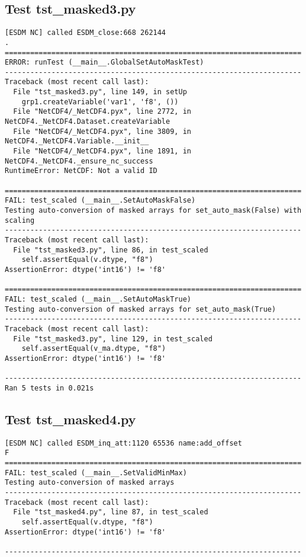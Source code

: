 \subsection{Test tst\_masked3.py}

\begin{verbatim}
[ESDM NC] called ESDM_close:668 262144
.
======================================================================
ERROR: runTest (__main__.GlobalSetAutoMaskTest)
----------------------------------------------------------------------
Traceback (most recent call last):
  File "tst_masked3.py", line 149, in setUp
    grp1.createVariable('var1', 'f8', ())
  File "NetCDF4/_NetCDF4.pyx", line 2772, in NetCDF4._NetCDF4.Dataset.createVariable
  File "NetCDF4/_NetCDF4.pyx", line 3809, in NetCDF4._NetCDF4.Variable.__init__
  File "NetCDF4/_NetCDF4.pyx", line 1891, in NetCDF4._NetCDF4._ensure_nc_success
RuntimeError: NetCDF: Not a valid ID

======================================================================
FAIL: test_scaled (__main__.SetAutoMaskFalse)
Testing auto-conversion of masked arrays for set_auto_mask(False) with scaling
----------------------------------------------------------------------
Traceback (most recent call last):
  File "tst_masked3.py", line 86, in test_scaled
    self.assertEqual(v.dtype, "f8")
AssertionError: dtype('int16') != 'f8'

======================================================================
FAIL: test_scaled (__main__.SetAutoMaskTrue)
Testing auto-conversion of masked arrays for set_auto_mask(True)
----------------------------------------------------------------------
Traceback (most recent call last):
  File "tst_masked3.py", line 129, in test_scaled
    self.assertEqual(v_ma.dtype, "f8")
AssertionError: dtype('int16') != 'f8'

----------------------------------------------------------------------
Ran 5 tests in 0.021s
\end{verbatim}

\subsection{Test tst\_masked4.py}

\begin{verbatim}
[ESDM NC] called ESDM_inq_att:1120 65536 name:add_offset
F
======================================================================
FAIL: test_scaled (__main__.SetValidMinMax)
Testing auto-conversion of masked arrays
----------------------------------------------------------------------
Traceback (most recent call last):
  File "tst_masked4.py", line 87, in test_scaled
    self.assertEqual(v.dtype, "f8")
AssertionError: dtype('int16') != 'f8'

----------------------------------------------------------------------
\end{verbatim}

